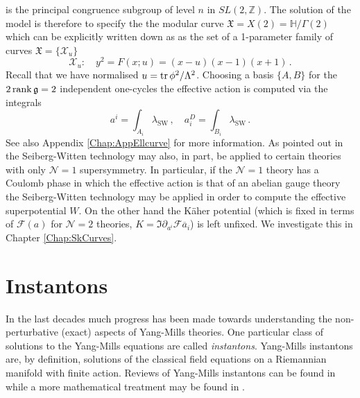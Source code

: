 \documentclass[main.tex]{subfiles}
\begin{document}
is the principal congruence subgroup of level $n$ in $SL(2,\mathbb{Z})$.
The solution of the model is therefore to specify the the modular curve $\mathfrak{X}=X(2)=\mathbb{H}/\Gamma(2)$ which can be explicitly written down as as the set of a 1-parameter family of curves $\mathfrak{X}=\{\mathcal{X}_u\}$
\begin{equation}
\mathcal{X}_u:\quad y^2=F(x;u)=(x-u)(x-1)(x+1)\,.
\end{equation}
Recall that we have normalised $u=\operatorname{tr}\phi^2/\Lambda^2$. Choosing a basis $\{A,B\}$ for the $2\operatorname{rank}\mathfrak{g}=2$ independent one-cycles the effective action is computed via the integrals
\begin{equation}
a^i=\int_{A_i}\lambda_{\text{SW}}\,,\quad a^D_i=\int_{B_i}\lambda_{\text{SW}}\,.
\end{equation}
See also Appendix \ref{Chap:AppEllcurve} for more information.  As pointed out in \cite{Seiberg:1994aj,Intriligator:1994sm} the Seiberg-Witten technology may also, in part, be applied to certain theories with only $\mathcal{N}=1$ supersymmetry.  In particular, if the $\mathcal{N}=1$ theory has a Coulomb phase in which the effective action is that of an abelian gauge theory the Seiberg-Witten technology may be applied in order to compute the effective superpotential $W$.  On the other hand the K\"aher potential (which is fixed in terms of $\mathcal{F}(a)$ for $\mathcal{N}=2$ theories, $K=\Im \partial_{a^i} \mathcal{F}\overline{a}_i$) is left unfixed. We investigate this in Chapter \ref{Chap:SkCurves}.

\section{Instantons}\label{Chap:AppInstADHM}
In the last decades much progress has been made towards understanding the non-perturbative (exact) aspects of Yang-Mills theories.  One particular class of solutions to the Yang-Mills equations are called \textit{instantons}.  Yang-Mills instantons are, by definition, solutions of the classical field equations on a Riemannian manifold with finite action.  Reviews of Yang-Mills instantons can be found in \cite{Belitsky:2000ws,Tachikawa:2014dja,Dorey:2002ik,Tong:2005un} while a more mathematical treatment may be found in \cite{Nakajima:2003uh}.
\end{document}
